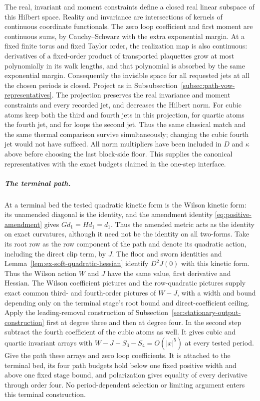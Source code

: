 The real, invariant and moment constraints define a closed real linear
subspace of this Hilbert space. Reality and invariance are intersections
of kernels of continuous coordinate functionals. The zero loop coefficient
and first moment are continuous sums, by Cauchy--Schwarz with the extra
exponential margin. At a fixed finite torus and fixed Taylor order, the
realization map is also continuous: derivatives of a fixed-order product
of transported plaquettes grow at most polynomially in its walk lengths,
and that polynomial is absorbed by the same exponential margin. Consequently
the invisible space for all requested jets at all the chosen periods is
closed. Project as in Subsubsection~\ref{subsec:path-vow-representatives}.
The projection preserves the real invariance and moment constraints and
every recorded jet, and decreases the Hilbert norm. For cubic atoms keep
both the third and fourth jets in this projection, for quartic atoms the
fourth jet, and for loops the second jet. Thus the same classical match
and the same thermal comparison survive simultaneously; changing the
cubic fourth jet would not have sufficed. All norm multipliers have been
included in $D$ and $\kappa$ above before choosing the last block-side
floor. This supplies the canonical representatives with the exact budgets
claimed in the one-step interface.

\subparagraph{The terminal path.}
At a terminal bed the tested quadratic kinetic form is the Wilson kinetic
form: its unamended diagonal is the identity, and the amendment identity
\eqref{eq:positive-amendment} gives $Gd_1=Hd_1=d_1$. Thus the amended
metric acts as the identity on exact curvatures, although it need not be
the identity on all two-forms. Take its root row as the row component of the path and denote its
quadratic action, including the direct clip term, by $J$. The floor and
sworn identities and Lemma~\ref{lem:ex-soft-quadratic-hessian} identify
$D^2J(0)$ with this kinetic form. Thus the Wilson action $W$ and $J$ have
the same value, first derivative and Hessian. The Wilson coefficient
pictures and the row-quadratic pictures supply exact common third- and
fourth-order pictures of $W-J$, with a width and bound depending only on
the terminal stage's root bound and direct-coefficient ceiling.
Apply the leading-removal construction of
Subsection~\ref{sec:stationary-output-construction} first at degree three
and then at degree four. In the second step subtract the fourth coefficient
of the cubic atoms as well. It gives cubic and quartic invariant arrays
with $W-J-S_3-S_4=O(|x|^5)$ at every tested period. Give the path these
arrays and zero loop coefficients. It is attached to the terminal bed,
its four path budgets hold below one fixed positive width and above one
fixed stage bound, and polarization gives equality of every derivative
through order four. No period-dependent selection or limiting argument
enters this terminal construction.

